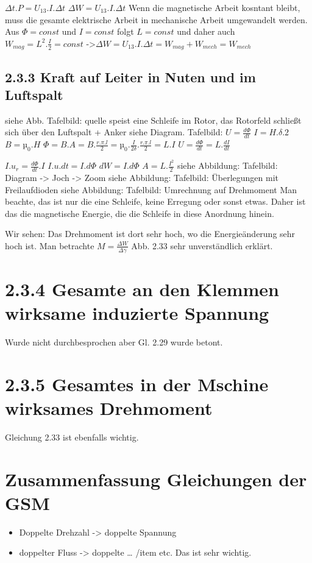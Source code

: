 \documentclass[a4paper]{article}
\begin{document}
$\Delta t . P=U_{13}.I.\Delta t$
$\Delta W = U_{13}.I.\Delta t$
Wenn die magnetische Arbeit kosntant bleibt, muss die gesamte elektrische Arbeit in mechanische Arbeit umgewandelt werden.
Aus $\Phi = const$ und $I =const$ folgt  $L=const$ und daher auch  $W_{mag}=L^2.\frac{I}{2}=const$ 
->$\Delta W=U_{13}.I.\Delta t = W_{mag} + W_{mech} = W_{mech}$

\subsection*{2.3.3 Kraft auf Leiter in Nuten und im Luftspalt}
siehe Abb. Tafelbild: quelle speist eine Schleife im Rotor, das Rotorfeld schließt sich über den Luftspalt + Anker
siehe Diagram. Tafelbild: 
$U=\frac{d\Phi}{dt}$ 
$I=H.\delta .2$
 $B=µ_0.H$
  $\Phi=B.A=B.\frac{r.\pi.l}{2}=µ_0.\frac{I}{2\delta}.\frac{r.\pi.l}{2}=L.I$ 
  $U=\frac{d\Phi}{dt}=L.\frac{dI}{dt}$ 

$I.u_r=\frac{d\Phi}{dt}.I$ 
$I.u.dt=I.d\Phi$ 
$dW=I.d\Phi$
 $A=L.\frac{I^2}{2}$ 
 siehe Abbildung: Tafelbild: Diagram -> Joch -> Zoom
siehe Abbildung: Tafelbild: Überlegungen mit Freilaufdioden
siehe Abbildung: Tafelbild: Umrechnung auf Drehmoment
Man beachte, das ist nur die eine Schleife, keine Erregung oder sonst etwas. Daher ist das die magnetische Energie, die die Schleife in diese Anordnung hinein.

Wir sehen: Das Drehmoment ist dort sehr hoch, wo die Energieänderung sehr hoch ist. Man betrachte $M=\frac{\Delta W}{\Delta \gamma}$
Abb. 2.33 sehr unverständlich erklärt.

\section*{2.3.4 Gesamte an den Klemmen wirksame induzierte Spannung}
Wurde nicht durchbesprochen aber Gl. 2.29 wurde betont.

\section*{2.3.5  Gesamtes in der Mschine wirksames Drehmoment}
Gleichung 2.33 ist ebenfalls wichtig.

\section*{Zusammenfassung Gleichungen der GSM}
\begin{itemize}
    \item Doppelte Drehzahl -> doppelte Spannung
    \item doppelter Fluss -> doppelte \ldots
    /item etc.
Das ist sehr wichtig.
\end{itemize}
\end{document}
